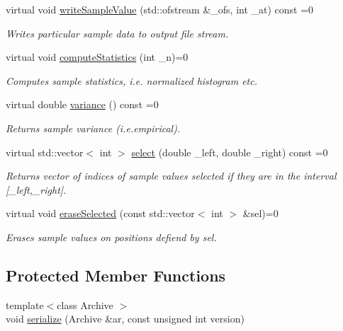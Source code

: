 \begin{DoxyCompactItemize}
virtual void \hyperlink{class_c_sample_ae259be8e58656626e12cedba8c99bacc}{write\-Sample\-Value} (std\-::ofstream \&\-\_\-ofs, int \-\_\-at) const =0
\begin{DoxyCompactList}\small\item\em Writes particular sample data to output file stream. \end{DoxyCompactList}\item 
virtual void \hyperlink{class_c_sample_a10000ec1dade335a2a96a8646e0bae03}{compute\-Statistics} (int \-\_\-n)=0
\begin{DoxyCompactList}\small\item\em Computes sample statistics, i.\-e. normalized histogram etc. \end{DoxyCompactList}\item 
virtual double \hyperlink{class_c_sample_a5ce1e4ff44a8ac2e021dc36541343651}{variance} () const =0
\begin{DoxyCompactList}\small\item\em Returns sample variance (i.\-e.\-empirical). \end{DoxyCompactList}\item 
virtual std\-::vector$<$ int $>$ \hyperlink{class_c_sample_acd41cc9c1219ea843abd59131ffaa458}{select} (double \-\_\-left, double \-\_\-right) const =0
\begin{DoxyCompactList}\small\item\em Returns vector of indices of sample values selected if they are in the interval \mbox{[}\-\_\-left,\-\_\-right\mbox{]}. \end{DoxyCompactList}\item 
virtual void \hyperlink{class_c_sample_a85d084b0fdf82081e265ad8ca39876f3}{erase\-Selected} (const std\-::vector$<$ int $>$ \&sel)=0
\begin{DoxyCompactList}\small\item\em Erases sample values on positions defiend by sel. \end{DoxyCompactList}\end{DoxyCompactItemize}
\subsection*{Protected Member Functions}
\begin{DoxyCompactItemize}
\item 
{\footnotesize template$<$class Archive $>$ }\\void \hyperlink{class_c_sample_a56f06010d5e070739b5983e12bc7751a}{serialize} (Archive \&ar, const unsigned int version)
\end{DoxyCompactItemize}
